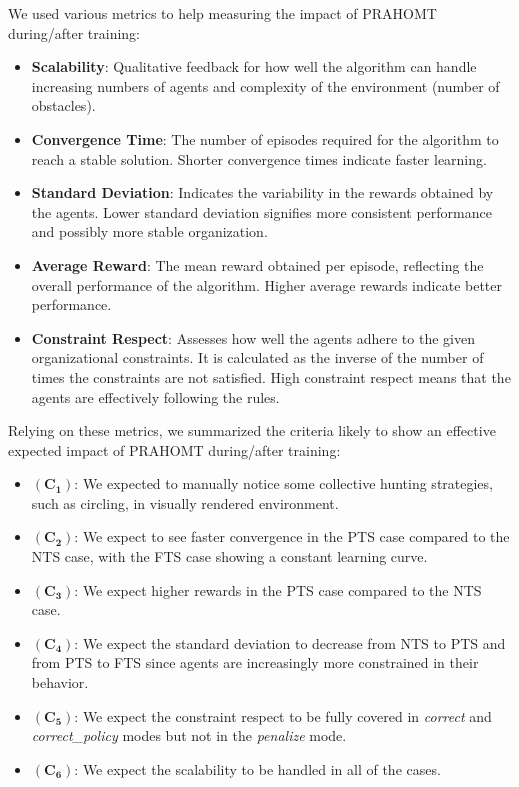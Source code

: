 \documentclass[runningheads]{llncs}
\theoremstyle{freethm}
\theoremstyle{proofoutline}
\begin{document}
We used various metrics to help measuring the impact of PRAHOMT during/after training:
\begin{itemize}
    \item \textbf{Scalability}: Qualitative feedback for how well the algorithm can handle increasing numbers of agents and complexity of the environment (number of obstacles).
    \item \textbf{Convergence Time}: The number of episodes required for the algorithm to reach a stable solution. Shorter convergence times indicate faster learning.
    \item \textbf{Standard Deviation}: Indicates the variability in the rewards obtained by the agents. Lower standard deviation signifies more consistent performance and possibly more stable organization.
    \item \textbf{Average Reward}: The mean reward obtained per episode, reflecting the overall performance of the algorithm. Higher average rewards indicate better performance.
    \item \textbf{Constraint Respect}: Assesses how well the agents adhere to the given organizational constraints. It is calculated as the inverse of the number of times the constraints are not satisfied. High constraint respect means that the agents are effectively following the rules.
\end{itemize}

Relying on these metrics, we summarized the criteria likely to show an effective expected impact of PRAHOMT during/after training:
\begin{itemize}
    \item $(\mathbf{C_1})$: We expected to manually notice some collective hunting strategies, such as circling, in visually rendered environment.
    \item $(\mathbf{C_2})$: We expect to see faster convergence in the PTS case compared to the NTS case, with the FTS case showing a constant learning curve.
    \item $(\mathbf{C_3})$: We expect higher rewards in the PTS case compared to the NTS case.
    \item $(\mathbf{C_4})$: We expect the standard deviation to decrease from NTS to PTS and from PTS to FTS since agents are increasingly more constrained in their behavior.
    \item $(\mathbf{C_5})$: We expect the constraint respect to be fully covered in \textit{correct} and \textit{correct\_policy} modes but not in the \textit{penalize} mode.
    \item $(\mathbf{C_6})$: We expect the scalability to be handled in all of the cases.
\end{itemize}
\end{document}
